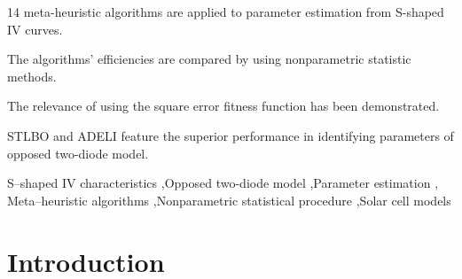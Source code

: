 \documentclass[a4paper,fleqn]{cas-dc}
\begin{document}

\begin{highlights}
\item 14 meta-heuristic algorithms are applied to parameter estimation from S-shaped IV curves.
\item The algorithms' efficiencies are compared by using nonparametric statistic methods.
\item The relevance of using the square error fitness function has been demonstrated.
\item STLBO and ADELI feature the superior performance in identifying parameters of opposed two-diode model.
\end{highlights}

\begin{keywords}
S--shaped IV characteristics \sep Opposed two-diode model \sep Parameter estimation \sep
Meta--heuristic algorithms \sep Nonparametric statistical procedure \sep Solar cell models
\end{keywords}

\maketitle

\section{Introduction}\label{Int}
\end{document}
